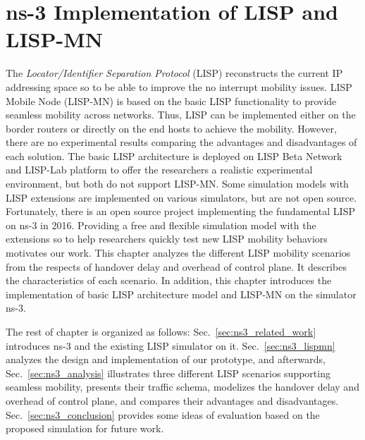 
\chapter{ns-3 Implementation of LISP and LISP-MN}
\label{cha:ns-3}

\ifpdf
    \graphicspath{{Chapter7/Pics/Raster/}{Chapter7/Pics/PDF/}{Chapter7/}}
\else
    \graphicspath{{Chapter7/Pics/Vector/}{Chapter7/}}
\fi

The \emph{Locator/Identifier Separation Protocol} (LISP) reconstructs the current IP addressing space so to be able to improve the no interrupt mobility issues. LISP Mobile Node (LISP-MN) is based on the basic LISP functionality to provide seamless mobility across networks. Thus, LISP can be implemented either on the border routers or directly on the end hosts to achieve the mobility. However, there are no experimental results comparing the advantages and disadvantages of each solution. The basic LISP architecture is deployed on LISP Beta Network and LISP-Lab platform to offer the researchers a realistic experimental environment, but both do not support LISP-MN. Some simulation models with LISP extensions are implemented on various simulators, but are not open source. Fortunately, there is an open source project implementing the fundamental LISP on ns-3 in 2016. Providing a free and flexible simulation model with the extensions so to help researchers quickly test new LISP mobility behaviors motivates our work. This chapter analyzes the different LISP mobility scenarios from the respects of handover delay and overhead of control plane. It describes the characteristics of each scenario. In addition, this chapter introduces the implementation of basic LISP architecture model and LISP-MN on the simulator ns-3. %

The rest of chapter is organized as follows: Sec.~\ref{sec:ns3_related_work} introduces ns-3 and the existing LISP simulator on it. Sec.~\ref{sec:ns3_lispmn} analyzes the design and implementation of our prototype, and afterwards, Sec.~\ref{sec:ns3_analysis} illustrates three different LISP scenarios supporting seamless mobility, presents their traffic schema, modelizes the handover delay and overhead of control plane, and compares their advantages and disadvantages. %
Sec.~\ref{sec:ns3_conclusion} provides some ideas of evaluation based on the proposed simulation for future work.

